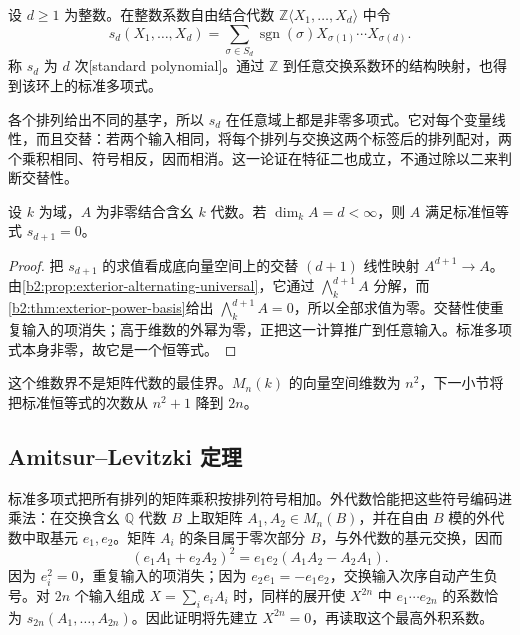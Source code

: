 \begin{definition}\label{b2:def:standard-polynomial}
	设 \(d\geq1\) 为整数。在整数系数自由结合代数 \(\mathbb Z\langle X_1,\ldots,X_d\rangle\) 中令
	\[
		s_d(X_1,\ldots,X_d) =\sum_{\sigma\in S_d}\operatorname{sgn}(\sigma) X_{\sigma(1)}\cdots X_{\sigma(d)}.
	\]
	称 \(s_d\) 为 \(d\) 次[standard polynomial]。通过 \(\mathbb Z\) 到任意交换系数环的结构映射，也得到该环上的标准多项式。
\end{definition}

各个排列给出不同的基字，所以 \(s_d\) 在任意域上都是非零多项式。它对每个变量线性，而且交替：若两个输入相同，将每个排列与交换这两个标签后的排列配对，两个乘积相同、符号相反，因而相消。这一论证在特征二也成立，不通过除以二来判断交替性。

\begin{proposition}\label{b2:prop:finite-dimensional-pi}
	设 \(k\) 为域，\(A\) 为非零结合含幺 \(k\) 代数。若 \(\dim_kA=d<\infty\)，则 \(A\) 满足标准恒等式 \(s_{d+1}=0\)。
\end{proposition}
\begin{proof}
	把 \(s_{d+1}\) 的求值看成底向量空间上的交替 \((d+1)\) 线性映射 \(A^{d+1}\to A\)。由\cref{b2:prop:exterior-alternating-universal}，它通过 \(\bigwedge^{d+1}_kA\) 分解，而\cref{b2:thm:exterior-power-basis}给出 \(\bigwedge^{d+1}_kA=0\)，所以全部求值为零。交替性使重复输入的项消失；高于维数的外幂为零，正把这一计算推广到任意输入。标准多项式本身非零，故它是一个恒等式。
\end{proof}

这个维数界不是矩阵代数的最佳界。\(M_n(k)\) 的向量空间维数为 \(n^2\)，下一小节将把标准恒等式的次数从 \(n^2+1\) 降到 \(2n\)。

\subsection{Amitsur–Levitzki 定理}
\label{b2:subsec:1903:02}

标准多项式把所有排列的矩阵乘积按排列符号相加。外代数恰能把这些符号编码进乘法：在交换含幺 \(\mathbb Q\) 代数 \(B\) 上取矩阵 \(A_1,A_2\in M_n(B)\)，并在自由 \(B\) 模的外代数中取基元 \(e_1,e_2\)。矩阵 \(A_i\) 的条目属于零次部分 \(B\)，与外代数的基元交换，因而
\[
	(e_1A_1+e_2A_2)^2 =e_1e_2(A_1A_2-A_2A_1).
\]
因为 \(e_i^2=0\)，重复输入的项消失；因为 \(e_2e_1=-e_1e_2\)，交换输入次序自动产生负号。对 \(2n\) 个输入组成 \(X=\sum_i e_iA_i\) 时，同样的展开使 \(X^{2n}\) 中 \(e_1\cdots e_{2n}\) 的系数恰为 \(s_{2n}(A_1,\ldots,A_{2n})\)。因此证明将先建立 \(X^{2n}=0\)，再读取这个最高外积系数。

